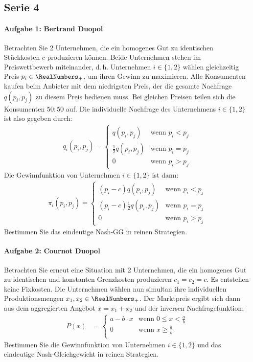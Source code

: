 \subsection{Serie 4}%
\label{sub:serie_4}

\paragraph{Aufgabe 1: Bertrand Duopol}%
\label{par:aufgabe_4_1}

Betrachten Sie 2 Unternehmen, die ein homogenes Gut zu identischen Stückkosten $c$
produzieren können.
Beide Unternehmen stehen im Preiswettbewerb miteinander, d.\,h. Unternehmen $i \in \{1,
2\}$ wählen gleichzeitig Preis $p_i \in \RealNumbers_+$, um ihren Gewinn zu maximieren.
Alle Konsumenten kaufen beim Anbieter mit dem niedrigsten Preis, der die gesamte Nachfrage
$q(p_i, p_j)$ zu diesem Preis bedienen muss.
Bei gleichen Preisen teilen sich die Konsumenten $50:50$ auf.
Die individuelle Nachfrage des Unternehmens $i \in \{1, 2\}$ ist also gegeben durch:
\begin{align*}
  q_i(p_i, p_j) =
  \begin{cases}
    q(p_i, p_j) & \text{wenn } p_i < p_j\\
    \frac{1}{2} q(p_i, p_j) & \text{wenn } p_i = p_j\\
    0 & \text{wenn } p_i > p_j
  \end{cases}
\end{align*}
Die Gewinnfunktion von Unternehmen $i \in \{1, 2\}$ ist dann:
\begin{align*}
  \pi_i(p_i, p_j) =
  \begin{cases}
    (p_i - c)q(p_i, p_j) & \text{wenn } p_i < p_j\\
    (p_i - c)\frac{1}{2} q(p_i, p_j) & \text{wenn } p_i = p_j\\
    0 & \text{wenn } p_i > p_j
  \end{cases}
\end{align*}
Bestimmen Sie das eindeutige Nash-GG in reinen Strategien.

\paragraph{Aufgabe 2: Cournot Duopol}%
\label{par:aufgabe_2_cournot_duopol}

Betrachten Sie erneut eine Situation mit 2 Unternehmen, die ein homogenes Gut zu
identischen und konstanten Grenzkosten produzieren $c_1 = c_2 = c$.
Es entstehen keine Fixkosten.
Die Unternehmen wählen nun simultan ihre individuellen Produktionsmengen $x_1, x_2 \in
\RealNumbers_+$.
Der Marktpreis ergibt sich dann aus dem aggregierten Angebot $x = x_1 + x_2$ und der
inversen Nachfragefunktion:
\begin{align*}
  P(x) & = \begin{cases}
    a - b \cdot x & \text{wenn } 0 \leq x < \frac{a}{b}\\
    0 & \text{wenn } x \geq \frac{a}{b}\\
  \end{cases}
\end{align*}
Bestimmen Sie die Gewinnfunktion von Unternehmen $i \in \{1,2\}$ und das eindeutige
Nash-Gleichgewicht in reinen Strategien.
